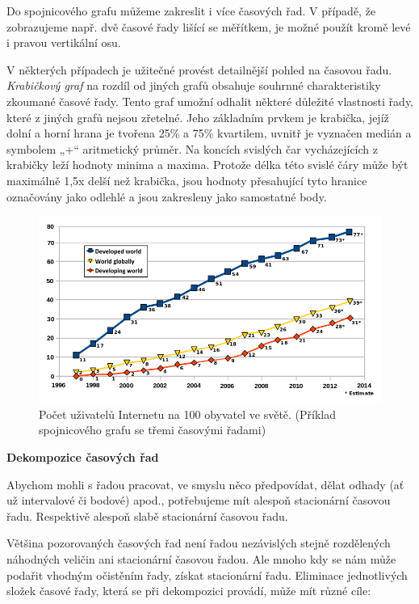 \documentclass[a4paper,12pt,twoside]{scrreprt}
\begin{document}
Do spojnicového grafu můžeme zakreslit i více časových řad. V případě, že
zobrazujeme např. dvě časové řady lišící se měřítkem, je možné použít kromě levé 
i pravou vertikální osu.

V některých případech je užitečné provést detailnější pohled na časovou řadu.
\textit{Krabičkový graf} na rozdíl od jiných grafů obsahuje souhrnné charakteristiky zkoumané
časové řady. Tento graf umožní odhalit některé důležité vlastnosti řady, které z jiných
grafů nejsou zřetelné. Jeho základním prvkem je krabička, jejíž dolní a horní hrana je
tvořena 25\% a 75\% kvartilem, uvnitř je vyznačen medián a symbolem „+“ aritmetický
průměr. Na koncích svislých čar vycházejících z krabičky leží hodnoty minima a maxima.
Protože délka této svislé čáry může být maximálně 1,5x delší než krabička, jsou hodnoty
přesahující tyto hranice označovány jako odlehlé a jsou zakresleny jako samostatné body.

\begin{figure}
  \centering
  \includegraphics[width=15cm]{pictures/users.png}
  \caption{Počet uživatelů Internetu na 100 obyvatel ve světě. \newline(Příklad spojnicového grafu se třemi časovými řadami)}
  \label{fig:řada}
\end{figure}

\normalsize\textbf{\newline Dekompozice časových řad}

Abychom mohli s řadou pracovat, ve smyslu něco předpovídat, dělat odhady (ať už intervalové
či bodové) apod., potřebujeme mít alespoň stacionární časovou řadu. Respektivě alespoň slabě
stacionární časovou řadu. 

Většina pozorovaných časových řad není řadou nezávislých stejně rozdělených náhodných
veličin ani stacionární časovou řadou. Ale mnoho kdy se nám může podařit vhodným očistěním
řady, získat stacionární řadu. Eliminace jednotlivých složek časové řady, která se při dekompozici provádí, může mít různé cíle:
\end{document}
